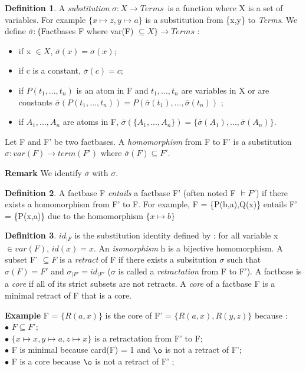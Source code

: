 \documentclass{article}
\theoremstyle{proposal}
\theoremstyle{definition}
\newtheorem{definition}{Definition}[section]
\theoremstyle{theorem}
\begin{document}
\begin{definition}
A \emph{substitution} $\sigma:X \to \textit{Terms}$\ is a function where X is a set of variables. For example $\{x \mapsto z, y \mapsto a \}$ is a substitution from \{x,y\} to \textit{Terms}. We define $\overline{\sigma}:\{$Factbases F where var(F) $\subseteq X\} \to \textit{Terms}$ :
\begin{itemize}
\item if x $\in X$, $\overline{\sigma}(x) = \sigma(x)$;
\item if c is a constant, $\overline{\sigma}(c) = c$;
\item if $P(t_{1},...,t_{n})$ is an atom in F and $t_1,...,t_n$ are variables in X or are constants $\overline{\sigma}(P(t_{1},...,t_{n})) = P(\overline{\sigma}(t_{1}),...,\overline{\sigma}(t_{n}))$ ;
\item if $A_{1},...,A_{n}$ are atoms in F, $\overline{\sigma}(\{A_{1},...,A_{n}\}) = \{\overline{\sigma}(A_{1}),...,\overline{\sigma}(A_{n})\}$.
\end{itemize}
Let F and F' be two factbases. A \emph{homomorphism} from F to F' is a substitution $\sigma:var(F) \to term(F')$ where $\overline{\sigma}(F) \subseteq F'$. 
\end{definition}
\noindent \textbf{Remark} We identify $\overline{\sigma}$ with $\sigma$.
\begin{definition}
A factbase F \emph{entails} a factbase F' (often noted F $\models F'$) if there exists a homomorphism from F' to F. For example, F = \{P(b,a),Q(x)\} entails F' = \{P(x,a)\} due to the homomorphism $\{x \mapsto b\}$ 
\end{definition}

\begin{definition}
$id_{|F}$ is the substitution identity defined by : for all variable x $\in var(F)$, $id(x) = x$. An \emph{isomorphism} h is a bijective homomorphism.  A subset F' $\subseteq F$ is a \emph{retract} of F if there exists a subsitution $\sigma$ such that $\sigma(F) = F'$ and $\sigma_{|F'}=id_{|F'}$ ($\sigma$ is called a \emph{retractation} from F to F'). A factbase is a \emph{core} if all of its strict subsets are not retracts. A \emph{core} of a factbase F is a minimal retract of F that is a core.
\end{definition}

\noindent \textbf{Example} F = $\{R(a,x)\}$ is the core of F' = $\{R(a,x),R(y,z)\}$ because : \\
$\bullet$ $F \subseteq F'$;\\
$\bullet$ $\{x \mapsto x, y \mapsto a, z \mapsto x\}$ is a retractation from F' to F;\\
$\bullet$ F is minimal because card(F) = 1 and $\o$ is not a retract of F';\\
$\bullet$ F is a core because $\o$ is not a retract of F' ;
\end{document}
